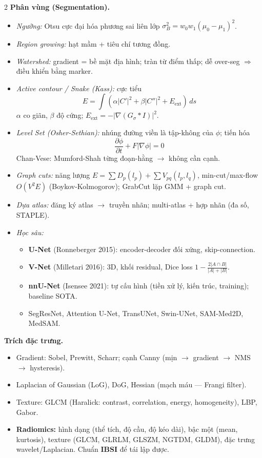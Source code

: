 \begin{paracol}{2}
\textbf{Phân vùng (Segmentation).}
\begin{itemize}[leftmargin=*,nosep]
  \item \emph{Ngưỡng:} Otsu cực đại hóa phương sai liên lớp $\sigma_B^2=w_0w_1(\mu_0-\mu_1)^2$.
  \item \emph{Region growing:} hạt mầm + tiêu chí tương đồng.
  \item \emph{Watershed:} gradient = bề mặt địa hình; tràn từ điểm thấp; dễ over-seg $\Rightarrow$ điều khiển bằng marker.
  \item \emph{Active contour / Snake (Kass):} cực tiểu
  $$E=\int(\alpha|C'|^2+\beta|C''|^2+E_{\text{ext}})\,ds$$
  $\alpha$ co giãn, $\beta$ độ cứng; $E_{\text{ext}}=-|\nabla(G_\sigma * I)|^2$.
  \item \emph{Level Set (Osher-Sethian):} nhúng đường viền là tập-không của $\phi$; tiến hóa
  $$\frac{\partial\phi}{\partial t}+F|\nabla\phi|=0$$
  Chan-Vese: Mumford-Shah từng đoạn-hằng $\to$ không cần cạnh.
  \item \emph{Graph cuts:} năng lượng $E=\sum D_p(l_p)+\sum V_{pq}(l_p,l_q)$, min-cut/max-flow $O(V^2E)$ (Boykov-Kolmogorov); GrabCut lặp GMM + graph cut.
  \item \emph{Dựa atlas:} đăng ký atlas $\to$ truyền nhãn; multi-atlas + hợp nhãn (đa số, STAPLE).
  \item \emph{Học sâu:}
    \begin{itemize}[leftmargin=*,nosep]
      \item \textbf{U-Net} (Ronneberger 2015): encoder-decoder đối xứng, skip-connection.
      \item \textbf{V-Net} (Milletari 2016): 3D, khối residual, Dice loss $1-\frac{2|A\cap B|}{|A|+|B|}$.
      \item \textbf{nnU-Net} (Isensee 2021): tự cấu hình (tiền xử lý, kiến trúc, training); baseline SOTA.
      \item SegResNet, Attention U-Net, TransUNet, Swin-UNet, SAM-Med2D, MedSAM.
    \end{itemize}
\end{itemize}

\textbf{Trích đặc trưng.}
\begin{itemize}[leftmargin=*,nosep]
  \item Gradient: Sobel, Prewitt, Scharr; cạnh Canny (mịn $\to$ gradient $\to$ NMS $\to$ hysteresis).
  \item Laplacian of Gaussian (LoG), DoG, Hessian (mạch máu — Frangi filter).
  \item Texture: GLCM (Haralick: contrast, correlation, energy, homogeneity), LBP, Gabor.
  \item \textbf{Radiomics:} hình dạng (thể tích, độ cầu, độ kéo dài), bậc một (mean, kurtosis), texture (GLCM, GLRLM, GLSZM, NGTDM, GLDM), đặc trưng wavelet/Laplacian. Chuẩn \textbf{IBSI} để tái lập được.
\end{itemize}


\end{paracol}
